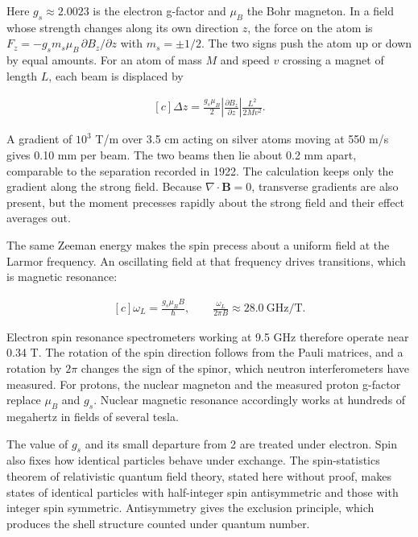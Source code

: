 \documentclass[11pt,oneside]{book}
\newenvironment{centeredalign}{\[\begin{gathered}[c]}{\end{gathered}\]}
\begin{document}
Here \(g_s\approx2.0023\) is the electron g-factor and \(\mu_B\) the Bohr magneton. In a field whose strength changes along its own direction \(z\), the force on the atom is \(F_z=-g_sm_s\mu_B\,\partial B_z/\partial z\) with \(m_s=\pm1/2\). The two signs push the atom up or down by equal amounts. For an atom of mass \(M\) and speed \(v\) crossing a magnet of length \(L\), each beam is displaced by

\begin{centeredalign}
\Delta z=\frac{g_s\mu_B}{2}\left|\frac{\partial B_z}{\partial z}\right|\frac{L^2}{2Mv^2}.
\end{centeredalign}

A gradient of \(10^3\) T/m over 3.5 cm acting on silver atoms moving at 550 m/s gives 0.10 mm per beam. The two beams then lie about 0.2 mm apart, comparable to the separation recorded in 1922. The calculation keeps only the gradient along the strong field. Because \(\nabla\cdot\mathbf B=0\), transverse gradients are also present, but the moment precesses rapidly about the strong field and their effect averages out.

The same Zeeman energy makes the spin precess about a uniform field at the Larmor frequency. An oscillating field at that frequency drives transitions, which is magnetic resonance:

\begin{centeredalign}
\omega_L=\frac{g_s\mu_BB}{\hbar},\qquad \frac{\omega_L}{2\pi B}\approx28.0\ \mathrm{GHz/T}.
\end{centeredalign}

Electron spin resonance spectrometers working at 9.5 GHz therefore operate near 0.34 T. The rotation of the spin direction follows from the Pauli matrices, and a rotation by \(2\pi\) changes the sign of the spinor, which neutron interferometers have measured. For protons, the nuclear magneton and the measured proton g-factor replace \(\mu_B\) and \(g_s\). Nuclear magnetic resonance accordingly works at hundreds of megahertz in fields of several tesla.

The value of \(g_s\) and its small departure from 2 are treated under electron. Spin also fixes how identical particles behave under exchange. The spin-statistics theorem of relativistic quantum field theory, stated here without proof, makes states of identical particles with half-integer spin antisymmetric and those with integer spin symmetric. Antisymmetry gives the exclusion principle, which produces the shell structure counted under quantum number.
\end{document}
